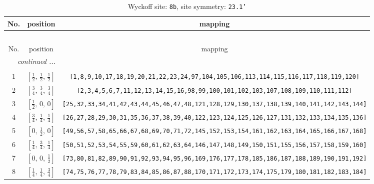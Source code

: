 \documentclass[fleqn,8pt]{jsarticle}
\begin{document}
\renewcommand{\arraystretch}{1.2}
\begin{longtable}{ccc}
\caption{Wyckoff site: {\tt 8b}, site symmetry: {\tt 23.1'}}
 \\
 \hline \hline
No. & position & mapping \\ \hline \endfirsthead

\multicolumn{2}{l}{\tablename\ \thetable{}} \\
 \hline \hline
No. & position & mapping \\ \hline \endhead

 \hline \hline
\multicolumn{2}{r}{\footnotesize\it continued ...} \\ \endfoot

 \hline \hline
\multicolumn{2}{r}{} \\ \endlastfoot

1 & $\left[ \frac{1}{2},\, \frac{1}{2},\, \frac{1}{2} \right]$ & {\tt [1,8,9,10,17,18,19,20,21,22,23,24,97,104,105,106,113,114,115,116,117,118,119,120]} \\ \hline
2 & $\left[ \frac{3}{4},\, \frac{3}{4},\, \frac{3}{4} \right]$ & {\tt [2,3,4,5,6,7,11,12,13,14,15,16,98,99,100,101,102,103,107,108,109,110,111,112]} \\ \hline
3 & $\left[ \frac{1}{2},\, 0,\, 0 \right]$ & {\tt [25,32,33,34,41,42,43,44,45,46,47,48,121,128,129,130,137,138,139,140,141,142,143,144]} \\ \hline
4 & $\left[ \frac{3}{4},\, \frac{1}{4},\, \frac{1}{4} \right]$ & {\tt [26,27,28,29,30,31,35,36,37,38,39,40,122,123,124,125,126,127,131,132,133,134,135,136]} \\ \hline
5 & $\left[ 0,\, \frac{1}{2},\, 0 \right]$ & {\tt [49,56,57,58,65,66,67,68,69,70,71,72,145,152,153,154,161,162,163,164,165,166,167,168]} \\ \hline
6 & $\left[ \frac{1}{4},\, \frac{3}{4},\, \frac{1}{4} \right]$ & {\tt [50,51,52,53,54,55,59,60,61,62,63,64,146,147,148,149,150,151,155,156,157,158,159,160]} \\ \hline
7 & $\left[ 0,\, 0,\, \frac{1}{2} \right]$ & {\tt [73,80,81,82,89,90,91,92,93,94,95,96,169,176,177,178,185,186,187,188,189,190,191,192]} \\ \hline
8 & $\left[ \frac{1}{4},\, \frac{1}{4},\, \frac{3}{4} \right]$ & {\tt [74,75,76,77,78,79,83,84,85,86,87,88,170,171,172,173,174,175,179,180,181,182,183,184]} \\
\end{longtable}
\renewcommand{\arraystretch}{1.2}
\end{document}
